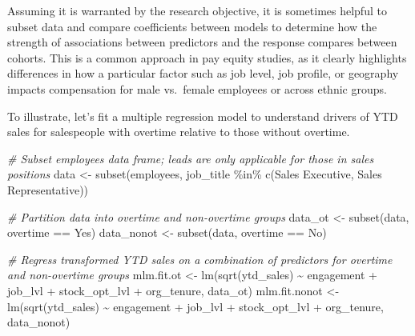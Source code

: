 \documentclass[
]{book}
\newenvironment{Shaded}{\begin{snugshade}}{\end{snugshade}}
\newcommand{\CommentTok}[1]{\textcolor[rgb]{0.56,0.35,0.01}{\textit{#1}}}
\newcommand{\FunctionTok}[1]{\textcolor[rgb]{0.00,0.00,0.00}{#1}}
\newcommand{\NormalTok}[1]{#1}
\newcommand{\OtherTok}[1]{\textcolor[rgb]{0.56,0.35,0.01}{#1}}
\newcommand{\SpecialCharTok}[1]{\textcolor[rgb]{0.00,0.00,0.00}{#1}}
\newcommand{\StringTok}[1]{\textcolor[rgb]{0.31,0.60,0.02}{#1}}
\begin{document}
Assuming it is warranted by the research objective, it is sometimes helpful to subset data and compare coefficients between models to determine how the strength of associations between predictors and the response compares between cohorts. This is a common approach in pay equity studies, as it clearly highlights differences in how a particular factor such as job level, job profile, or geography impacts compensation for male vs.~female employees or across ethnic groups.

To illustrate, let's fit a multiple regression model to understand drivers of YTD sales for salespeople with overtime relative to those without overtime.

\begin{Shaded}
\begin{Highlighting}[]
\CommentTok{\# Subset employees data frame; leads are only applicable for those in sales positions}
\NormalTok{data }\OtherTok{\textless{}{-}} \FunctionTok{subset}\NormalTok{(employees, job\_title }\SpecialCharTok{\%in\%} \FunctionTok{c}\NormalTok{(}\StringTok{\textquotesingle{}Sales Executive\textquotesingle{}}\NormalTok{, }\StringTok{\textquotesingle{}Sales Representative\textquotesingle{}}\NormalTok{))}

\CommentTok{\# Partition data into overtime and non{-}overtime groups}
\NormalTok{data\_ot }\OtherTok{\textless{}{-}} \FunctionTok{subset}\NormalTok{(data, overtime }\SpecialCharTok{==} \StringTok{\textquotesingle{}Yes\textquotesingle{}}\NormalTok{)}
\NormalTok{data\_nonot }\OtherTok{\textless{}{-}} \FunctionTok{subset}\NormalTok{(data, overtime }\SpecialCharTok{==} \StringTok{\textquotesingle{}No\textquotesingle{}}\NormalTok{)}

\CommentTok{\# Regress transformed YTD sales on a combination of predictors for overtime and non{-}overtime groups}
\NormalTok{mlm.fit.ot }\OtherTok{\textless{}{-}} \FunctionTok{lm}\NormalTok{(}\FunctionTok{sqrt}\NormalTok{(ytd\_sales) }\SpecialCharTok{\textasciitilde{}}\NormalTok{ engagement }\SpecialCharTok{+}\NormalTok{ job\_lvl }\SpecialCharTok{+}\NormalTok{ stock\_opt\_lvl }\SpecialCharTok{+}\NormalTok{ org\_tenure, data\_ot)}
\NormalTok{mlm.fit.nonot }\OtherTok{\textless{}{-}} \FunctionTok{lm}\NormalTok{(}\FunctionTok{sqrt}\NormalTok{(ytd\_sales) }\SpecialCharTok{\textasciitilde{}}\NormalTok{ engagement }\SpecialCharTok{+}\NormalTok{ job\_lvl }\SpecialCharTok{+}\NormalTok{ stock\_opt\_lvl }\SpecialCharTok{+}\NormalTok{ org\_tenure, data\_nonot)}
\end{Highlighting}
\end{Shaded}
\end{document}
